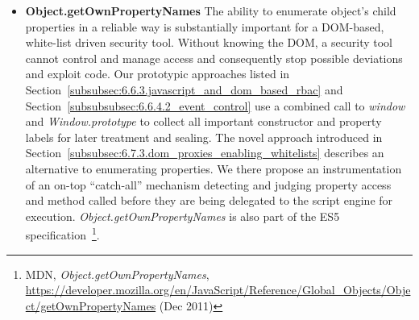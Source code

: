\begin{itemize}
	Six different descriptors are available: \textit{get} to define a function being called once get access to the property occurs, \textit{set} to define a function to be called once write-type property access occurs, \textit{value} to define the value of the property (which cannot be set once get/set are being defined and vice versa, since this would generate a conflict), \textit{writable} to define possibility to overwrite the property, \textit{enumerable} to define visibility in a \textit{for in} loop, and ultimately, \textit{configurable} to define if the property should be re-definable or persistent in a final state after the definition. 
	The last of the listed descriptors is comparable to \textit{Object.seal} and fundamental for a tamper resistant DOM security tool. We will clarify the importance of tampering-resistance in the later sections of this thesis and show real-life use cases for security enhancements pertaining to the existing libraries upon the employment of this object extension. The following code would call the alert method, once the attempt to overwrite a good property of the window is performed: \texttt{Object.defineProperty(window, 'good', \{set: function()\{alert(arguments.callee.caller + ' attempted write access')\\
\}\})}. Unlike several approaches summarized in Section~\ref{subsubsec:6.3.1.proprietary_approaches}, the ES5 syntax is the first standardized and universally available way to define object's properties~\footnote{MDN, \textit{Object.defineProperty}, \url{https://developer.mozilla.org/en/JavaScript/Reference/Global_Objects/Object/defineProperty} (Dec 2011)}. For a comprehensively working security library, it might make sense in many practical use cases to ultimately re-define \textit{Object.defineProperty} with an empty value in order to prevent an attacker from abusing the power that this method often has.
	\item \textbf{Object.getOwnPropertyNames} The ability to enumerate object's child properties in a reliable way is substantially important for a DOM-based, white-list driven security tool. Without knowing the DOM, a security tool cannot control and manage access and consequently stop possible deviations and exploit code. Our prototypic approaches listed in Section~\ref{subsubsec:6.6.3.javascript_and_dom_based_rbac} and Section~\ref{subsubsubsec:6.6.4.2_event_control} use a combined call to \textit{window} and \textit{Window.prototype} to collect all important constructor and property labels for later treatment and sealing. The novel approach introduced in Section~\ref{subsubsec:6.7.3.dom_proxies_enabling_whitelists} describes an alternative to enumerating properties. We there propose an instrumentation of an on-top ``catch-all'' mechanism detecting and judging property access and method called before they are being delegated to the script engine for execution. \textit{Object.getOwnPropertyNames} is also part of the ES5 specification~\footnote{MDN, \textit{Object.getOwnPropertyNames}, \url{https://developer.mozilla.org/en/JavaScript/Reference/Global_Objects/Object/getOwnPropertyNames} (Dec 2011)}.

\end{itemize}
